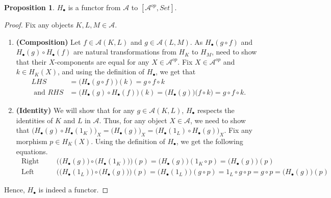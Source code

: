 \documentclass[a4paper]{article}
\theoremstyle{definition}
\newtheorem{prop}[theorem]{Proposition}
\begin{document}
		\begin{prop} $H_\bullet$ is a functor from $\mathcal{A}$ to $[\mathcal{A} ^{op},Set]$.
		\end{prop}
		\begin{proof}\setcounter{equation}{0}
			Fix any objects $K,L,M \in \mathcal{A} $.
			\begin{enumerate}[label=\Roman*]
				\item \textbf{ (Composition) }
					Let $f \in \mathcal{A} (K,L)$ and $g \in \mathcal{A} (L,M)$.
					As $H_\bullet(g \circ f)$ and $H_\bullet(g) \circ H_\bullet(f)$
					are natural transformations from $H_K$ to $H_M$,
					need to show that their	$X$-components are equal
					for any $X\in \mathcal{A} ^{op}$. Fix $X\in \mathcal{A} ^{op}$ and
					$k \in H_K(X)$,	and using the definition of $H_\bullet$, we get that
					\begin{align*}
						LHS&=\big( H_\bullet(g \circ f) \big) (k)=
						g\circ f \circ k \\
						\text{ and } RHS&=
						\Big( H_\bullet(g) \circ H_\bullet(f) \Big) (k)
						=\Big(H_\bullet(g)\Big) \big(f \circ k\big)
					=g\circ f \circ k. \end{align*}
				\item \textbf{ (Identity) } We will show that for any $g \in \mathcal{A} (K,L)$, $H_\bullet$
					respects the identities	of $K$ and $L$ in $\mathcal{A}$.
					Thus, for any object $X \in \mathcal{A} $, we need to show that
					$\Big( H_\bullet(g) \circ H_\bullet(1_K) \Big)_X = \Big( H_\bullet(g)\Big) _X
					=\Big( H_\bullet(1_L) \circ H_\bullet(g) \Big)_X $.
					Fix any morphism $p \in H_K(X)$.
					Using the definition of $H_\bullet$,
					we get the following equations.
					\begin{align*}
						\text{ Right Identity: }& \Big( \big( H_\bullet(g) \big) \circ \big( H_\bullet(1_K)
						\big) \Big)(p)
						=\big( H_\bullet(g) \big) (1_K \circ p) =
						\big( H_\bullet(g) \big) (p) \\
								\text{ Left Identity: }& \Big( \big( H_\bullet(1_L) \big) \circ \big( H_\bullet(g)\big) \Big)(p)
								=\big( H_\bullet(1_L) \big) (g \circ p) =1_L \circ g \circ p =g \circ p
								= \big( H_\bullet(g) \big)(p)
							\end{align*}

				\end{enumerate}
				Hence, $H_\bullet$ is indeed a functor.
			\end{proof}
\end{document}
